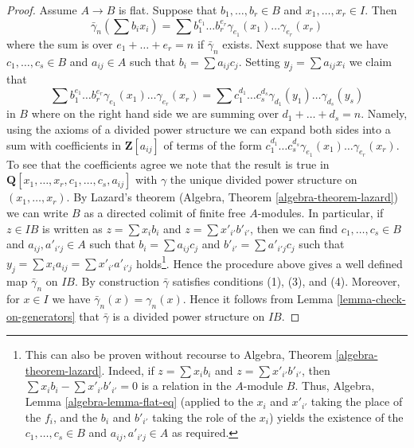 \begin{proof}
\medskip\noindent
Assume $A \to B$ is flat. Suppose that $b_1, \ldots, b_r \in B$ and
$x_1, \ldots, x_r \in I$. Then
$$
\bar\gamma_n(\sum b_ix_i) =
\sum b_1^{e_1} \ldots b_r^{e_r} \gamma_{e_1}(x_1) \ldots \gamma_{e_r}(x_r)
$$
where the sum is over $e_1 + \ldots + e_r = n$
if $\bar\gamma_n$ exists. Next suppose that we have $c_1, \ldots, c_s \in B$
and $a_{ij} \in A$ such that $b_i = \sum a_{ij}c_j$.
Setting $y_j = \sum a_{ij}x_i$ we claim that
$$
\sum b_1^{e_1} \ldots b_r^{e_r} \gamma_{e_1}(x_1) \ldots \gamma_{e_r}(x_r) =
\sum c_1^{d_1} \ldots c_s^{d_s} \gamma_{d_1}(y_1) \ldots \gamma_{d_s}(y_s)
$$
in $B$ where on the right hand side we are summing over
$d_1 + \ldots + d_s = n$. Namely, using the axioms of a divided power
structure we can expand both sides into a sum with coefficients
in $\mathbf{Z}[a_{ij}]$ of terms of the form
$c_1^{d_1} \ldots c_s^{d_s}\gamma_{e_1}(x_1) \ldots \gamma_{e_r}(x_r)$.
To see that the coefficients agree we note that the result is true
in $\mathbf{Q}[x_1, \ldots, x_r, c_1, \ldots, c_s, a_{ij}]$ with
$\gamma$ the unique divided power structure on $(x_1, \ldots, x_r)$.
By Lazard's theorem (Algebra, Theorem \ref{algebra-theorem-lazard})
we can write $B$ as a directed colimit of finite free $A$-modules.
In particular, if $z \in IB$ is written as $z = \sum x_ib_i$ and
$z = \sum x'_{i'}b'_{i'}$, then we can find $c_1, \ldots, c_s \in B$
and $a_{ij}, a'_{i'j} \in A$ such that $b_i = \sum a_{ij}c_j$
and $b'_{i'} = \sum a'_{i'j}c_j$ such that
$y_j = \sum x_ia_{ij} = \sum x'_{i'}a'_{i'j}$ holds\footnote{This
can also be proven without recourse to
Algebra, Theorem \ref{algebra-theorem-lazard}. Indeed, if
$z = \sum x_ib_i$ and $z = \sum x'_{i'}b'_{i'}$, then
$\sum x_ib_i - \sum x'_{i'}b'_{i'} = 0$ is a relation in the
$A$-module $B$. Thus, Algebra, Lemma \ref{algebra-lemma-flat-eq}
(applied to the $x_i$ and $x'_{i'}$ taking the place of the $f_i$,
and the $b_i$ and $b'_{i'}$ taking the role of the $x_i$) yields
the existence of the $c_1, \ldots, c_s \in B$
and $a_{ij}, a'_{i'j} \in A$ as required.}.
Hence the procedure above gives a well defined map $\bar\gamma_n$
on $IB$. By construction $\bar\gamma$ satisfies conditions (1), (3), and
(4). Moreover, for $x \in I$ we have $\bar\gamma_n(x) = \gamma_n(x)$. Hence
it follows from Lemma \ref{lemma-check-on-generators} that $\bar\gamma$
is a divided power structure on $IB$.
\end{proof}

